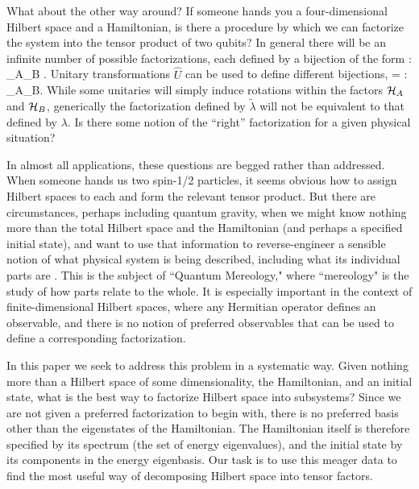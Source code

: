 \documentclass[aps,pra,onecolumn,nofootinbib,notitlepage,11pt,tightenlines]{revtex4-1}
\begin{document}
What about the other way around?
If someone hands you a four-dimensional Hilbert space and a Hamiltonian, is there a procedure by which we can factorize the system into the tensor product of two qubits?
In general there will be an infinite number of possible factorizations, each defined by a bijection of the form 
\be
\lambda : \hs \rightarrow \hs_A\otimes \hs_B .
\ee
Unitary transformations $\hat U$ can be used to define different bijections, 
\be
\tilde\lambda = \lambda \circ {} : \hs \rightarrow \hs_A\otimes \hs_B.
\ee
While some unitaries will simply induce rotations within the factors $\mathcal{H}_A$ and $\mathcal{H}_B$, generically the factorization defined by $\tilde\lambda$ will not be equivalent to that defined by $\lambda$.
Is there some notion of the ``right'' factorization for a given physical situation?

In almost all applications, these questions are begged rather than addressed.
When someone hands us two spin-1/2 particles, it seems obvious how to assign Hilbert spaces to each and form the relevant tensor product.
But there are circumstances, perhaps including quantum gravity, when we might know nothing more than the total Hilbert space and the Hamiltonian (and perhaps a specified initial state), and want to use that information to reverse-engineer a sensible notion of what physical system is being described, including what its individual parts are \cite{Carroll:2018rhc}.
This is the subject of ``Quantum Mereology," where ``mereology" is the study of how parts relate to the whole.
It is especially important in the context of finite-dimensional Hilbert spaces, where any Hermitian operator defines an observable, and there is no notion of preferred observables that can be used to define a corresponding factorization.

In this paper we seek to address this problem in a systematic way.
Given nothing more than a Hilbert space of some dimensionality, the Hamiltonian, and an initial state, what is the best way to factorize Hilbert space into subsystems?
Since we are not given a preferred factorization to begin with, there is no preferred basis other than the eigenstates of the Hamiltonian.
The Hamiltonian itself is therefore specified by its spectrum (the set of energy eigenvalues), and the initial state by its components in the energy eigenbasis.
Our task is to use this meager data to find the most useful way of decomposing Hilbert space into tensor factors. %
\end{document}

